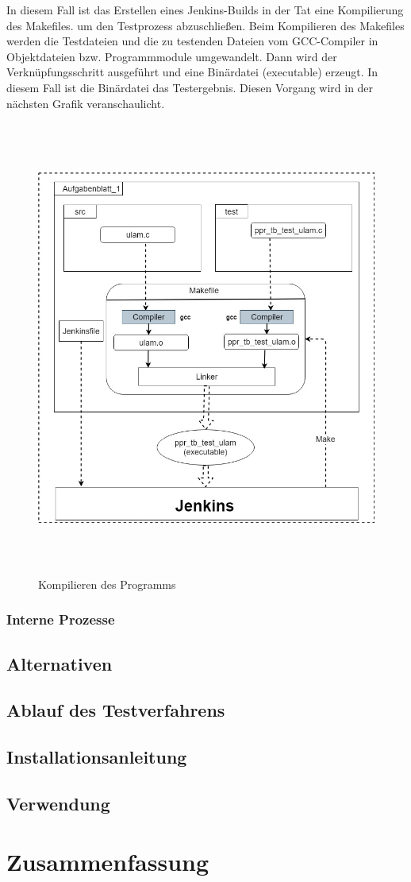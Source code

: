 \documentclass[a4paper,12pt,oneside]{book}
\begin{document}
\newline
In diesem Fall ist das Erstellen eines Jenkins-Builds in der Tat eine Kompilierung des Makefiles. um den Testprozess abzuschließen.
\newline
Beim Kompilieren des Makefiles werden die Testdateien und die zu testenden Dateien vom GCC-Compiler in Objektdateien bzw. Programmmodule umgewandelt. Dann wird der Verknüpfungsschritt ausgeführt und eine Binärdatei (executable) erzeugt. In diesem Fall ist die Binärdatei das Testergebnis. Diesen Vorgang wird in der nächsten Grafik veranschaulicht.
\begin{figure}[h!]
	\begin{center}
		\includegraphics[width=14cm, height=15cm]{Makefile.jpg}
		\caption{Kompilieren des Programms} 
		\label{Kompilieren des Programms} 
	\end{center}
\end{figure}
\subsection{Interne Prozesse}
\section{Alternativen}
\section{Ablauf des Testverfahrens}
\section{Installationsanleitung}
\section{Verwendung}
\chapter{Zusammenfassung}
\begin{thebibliography}{9}
\end{thebibliography}
\end{document}

